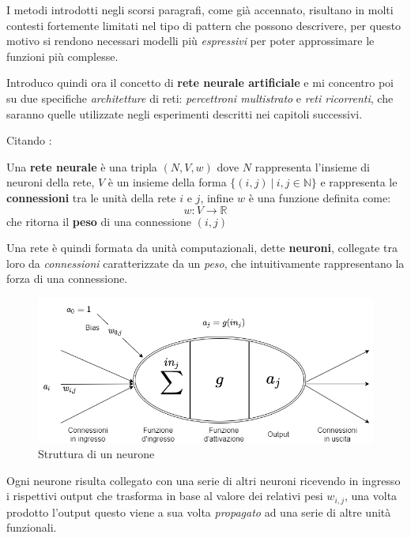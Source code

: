 \documentclass[../../main.tex]{subfiles}
\begin{document}
I metodi introdotti negli scorsi paragrafi, come già accennato, risultano in molti contesti fortemente limitati nel tipo di pattern che possono descrivere, per questo motivo si rendono necessari modelli più \textit{espressivi} per poter approssimare le funzioni più complesse.

Introduco quindi ora il concetto di \textbf{rete neurale artificiale} e mi concentro poi su due specifiche \textit{architetture} di reti: \textit{percettroni multistrato} e \textit{reti ricorrenti}, che saranno quelle utilizzate negli esperimenti descritti nei capitoli successivi.  

Citando \cite{kriesel2007bin}:

\begin{dfn}
    Una \textbf{rete neurale} è una tripla $(N, V, w)$ dove $N$ rappresenta l'insieme di neuroni della rete, $V$ è un insieme della forma $\{(i, j) \ | \ i,j \in \mathbb{N} \}$ e rappresenta le \textbf{connessioni} tra le unità della rete $i$ e $j$, infine $w$ è una funzione definita come:
    \[w : V \rightarrow \mathbb{R}\]
    che ritorna il \textbf{peso} di una connessione $(i, j)$
\end{dfn}

Una rete è quindi formata da unità computazionali, dette \textbf{neuroni}, collegate tra loro da \textit{connessioni} caratterizzate da un \textit{peso}, che intuitivamente rappresentano la forza di una connessione.

\begin{figure}[H]
    \centering
    \includegraphics[width=\textwidth]{immagini/4_2/neuron.png}
    \caption{Struttura di un neurone}
    \label{fig:neuron}
\end{figure}

Ogni neurone risulta collegato con una serie di altri neuroni ricevendo in ingresso i rispettivi output che trasforma in base al valore dei relativi pesi $w_{i,j}$, una volta prodotto l'output questo viene a sua volta \textit{propagato} ad una serie di altre unità funzionali.
\end{document}
